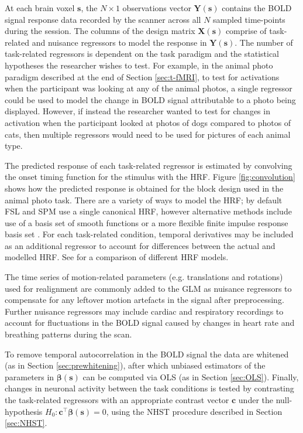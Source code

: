 At each brain voxel $\bm{s}$, the $N \times 1$ observations vector $\bm{Y}(\bm{s})$ contains the BOLD signal response data recorded by the scanner across all $N$ sampled time-points during the session. The columns of the design matrix $\bm{X}(\bm{s})$  comprise of task-related and nuisance regressors to model the response in $\bm{Y}(\bm{s})$. The number of task-related regressors is dependent on the task paradigm and the statistical hypotheses the researcher wishes to test. For example, in the animal photo paradigm described at the end of Section \ref{sec:t-fMRI}, to test for activations when the participant was looking at any of the animal photos, a single regressor could be used to model the change in BOLD signal attributable to a photo being displayed. However, if instead the researcher wanted to test for changes in activation when the participant looked at photos of dogs compared to photos of cats, then multiple regressors would need to be used for pictures of each animal type. 

The predicted response of each task-related regressor is estimated by convolving the onset timing function for the stimulus with the HRF. Figure \ref{fig:convolution} shows how the predicted response is obtained for the block design used in the animal photo task. There are a variety of ways to model the HRF; by default FSL and SPM use a single canonical HRF, however alternative methods include use of a basis set of smooth functions \citep{Friston1998-jl} or a more flexible finite impulse response basis set \citep{Goutte2000-vd}. For each task-related condition, temporal derivatives may be included as an additional regressor to account for differences between the actual and modelled HRF. See \citet{Lindquist2009-fs} for a comparison of different HRF models.

The time series of motion-related parameters (e.g. translations and rotations) used for realignment are commonly added to the GLM as nuisance regressors to compensate for any leftover motion artefacts in the signal after preprocessing. Further nuisance regressors may include cardiac and respiratory recordings to account for fluctuations in the BOLD signal caused by changes in heart rate and breathing patterns during the scan. 

To remove temporal autocorrelation in the BOLD signal the data are whitened (as in Section \ref{sec:prewhitening}), after which unbiased estimators of the parameters in $\bm{\beta}(\bm{s})$ can be computed via OLS (as in Section \ref{sec:OLS}). Finally, changes in neuronal activity between the task conditions is tested by contrasting the task-related regressors with an appropriate contrast vector $\bm{c}$ under the null-hypothesis $H_{0} : \bm{c}^{\intercal}\bm{\beta}(\bm{s}) = 0$, using the NHST procedure described in Section \ref{sec:NHST}.  

